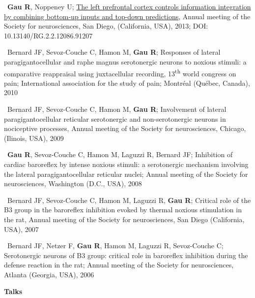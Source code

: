 \documentclass[a4paper,12pt,oneside]{letter}
\begin{document}
{\textbullet~\textbf{Gau R}, Noppeney U; \href{http://www.researchgate.net/profile/Remi_Gau/publication/312040995_Effect_of_sensory_modality_and_attention_on_layer-specific_activations_in_sensory_cortices/links/586bef4108ae329d621216ff.pdf?origin=publication_detail&ev=pub_int_prw_xdl&msrp=rWGQkC7vAu_P6H2YxCI3M31egmAPzpbXdoRN1OdTlFE2ytvRyytc2DItV2mPnvlGPXAOT-Q0hOx0cWKEfhvF_ZK7oOzQtXTOX1cxj1f7wdc.EjFU3lhxIUR_qptyNrCYqZDXVg6nG7zWe8VL0WxLSdSMUGnjz_v4L5Yov-RWctdEwDPFRXLasy1FBdCk7Dlydw.IANTdlTw5MPB88HQJNdTi7lFv6Sygddbknct3mMTSsgH20heYrYcKnbsQLxtcsNd-HHWZUEIEP4-7bkQLNDUhQ}{The left prefrontal cortex controls information integration by combining bottom-up inputs and top-down predictions}, Annual meeting of the Society for neurosciences, San Diego, (California, USA), 2013; DOI: 10.13140/RG.2.2.12086.91207

\textbullet~Bernard JF, Sevoz-Couche C, Hamon M, \textbf{Gau R}; Responses of lateral paragigantocellular and raphe magnus serotonergic neurons to noxious stimuli: a comparative reappraisal using juxtacellular recording, 13\textsuperscript{th} world congress on pain; International association for the study of pain; Montréal (Québec, Canada), 2010

\textbullet~Bernard JF, Sevoz-Couche C, Hamon M, \textbf{Gau R}; Involvement of lateral paragigantocellular reticular serotonergic and non-serotonergic neurons in nociceptive processes, Annual meeting of the Society for neurosciences, Chicago, (Ilinois, USA), 2009

\textbullet~\textbf{Gau R}, Sevoz-Couche C, Hamon M, Laguzzi R, Bernard JF; Inhibition of cardiac baroreflex by intense noxious stimuli: a serotonergic mechanism involving the lateral paragigantocellular reticular nuclei; Annual meeting of the Society for neurosciences, Washington (D.C., USA), 2008

\textbullet~Bernard JF, Sevoz-Couche C, Hamon M, Laguzzi R, \textbf{Gau R}; Critical role of the B3 group in the baroreflex inhibition evoked by thermal noxious stimulation in the rat, Annual meeting of the Society for neurosciences, San Diego (California, USA), 2007

\textbullet~Bernard JF, Netzer F, \textbf{Gau R}, Hamon M, Laguzzi R, Sevoz-Couche C; Serotonergic neurons of B3 group: critical role in baroreflex inhibition during the defense reaction in the rat; Annual meeting of the Society for neurosciences, Atlanta (Georgia, USA), 2006


\begin{center}
\Large\textbf{Talks}
\end{center}

}
\end{document}
